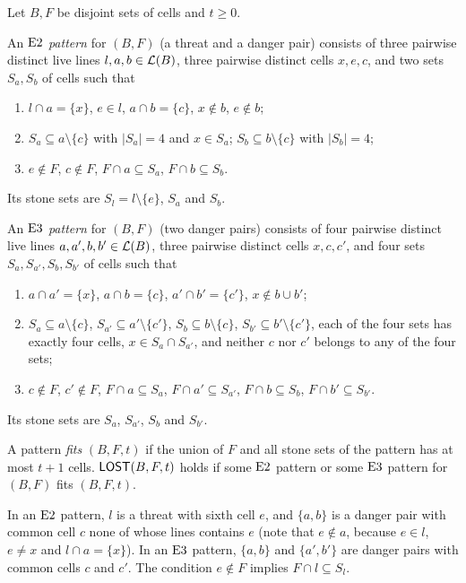 \begin{definition}\label{def:lost}
Let $B,F$ be disjoint sets of cells and $t\ge 0$.

An \emph{$\mathrm{E2}$ pattern} for $(B,F)$ (a threat and a danger pair) consists of three pairwise distinct live
lines $l,a,b\in\mathcal{L}(B)$, three pairwise distinct cells $x,e,c$, and two sets $S_a,S_b$ of cells such that
\begin{enumerate}[label=\textup{(E2.\arabic*)},leftmargin=3.6em]
\item $l\cap a=\{x\}$, $e\in l$, $a\cap b=\{c\}$, $x\notin b$, $e\notin b$;
\item $S_a\subseteq a\setminus\{c\}$ with $|S_a|=4$ and $x\in S_a$; $S_b\subseteq b\setminus\{c\}$ with $|S_b|=4$;
\item $e\notin F$, $c\notin F$, $F\cap a\subseteq S_a$, $F\cap b\subseteq S_b$.
\end{enumerate}
Its stone sets are $S_l=l\setminus\{e\}$, $S_a$ and $S_b$.

An \emph{$\mathrm{E3}$ pattern} for $(B,F)$ (two danger pairs) consists of four pairwise distinct live lines
$a,a',b,b'\in\mathcal{L}(B)$, three pairwise distinct cells $x,c,c'$, and four sets $S_a,S_{a'},S_b,S_{b'}$ of cells
such that
\begin{enumerate}[label=\textup{(E3.\arabic*)},leftmargin=3.6em]
\item $a\cap a'=\{x\}$, $a\cap b=\{c\}$, $a'\cap b'=\{c'\}$, $x\notin b\cup b'$;
\item $S_a\subseteq a\setminus\{c\}$, $S_{a'}\subseteq a'\setminus\{c'\}$, $S_b\subseteq b\setminus\{c\}$,
  $S_{b'}\subseteq b'\setminus\{c'\}$, each of the four sets has exactly four cells, $x\in S_a\cap S_{a'}$,
  and neither $c$ nor $c'$ belongs to any of the four sets;
\item $c\notin F$, $c'\notin F$, $F\cap a\subseteq S_a$, $F\cap a'\subseteq S_{a'}$, $F\cap b\subseteq S_b$,
  $F\cap b'\subseteq S_{b'}$.
\end{enumerate}
Its stone sets are $S_a$, $S_{a'}$, $S_b$ and $S_{b'}$.

A pattern \emph{fits} $(B,F,t)$ if the union of $F$ and all stone sets of the pattern has at most $t+1$ cells.
$\mathsf{LOST}(B,F,t)$ holds if some $\mathrm{E2}$ pattern or some $\mathrm{E3}$ pattern for $(B,F)$ fits $(B,F,t)$.
\end{definition}

In an $\mathrm{E2}$ pattern, $l$ is a threat with sixth cell $e$, and $\{a,b\}$ is a danger pair with common cell
$c$ none of whose lines contains $e$ (note that $e\notin a$, because $e\in l$, $e\ne x$ and
$l\cap a=\{x\}$). In an $\mathrm{E3}$ pattern, $\{a,b\}$ and $\{a',b'\}$ are danger pairs with common cells $c$
and $c'$. The condition $e\notin F$ implies $F\cap l\subseteq S_l$.

